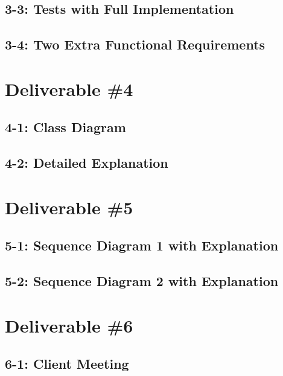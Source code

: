 \documentclass[11pt,a4paper]{article}
\begin{document}
\subsection*{3-3: Tests with Full Implementation}

\subsection*{3-4: Two Extra Functional Requirements}

\newpage


\section*{Deliverable \#4}

\subsection*{4-1: Class Diagram}

\subsection*{4-2: Detailed Explanation}

\newpage

\section*{Deliverable \#5}

\subsection*{5-1: Sequence Diagram 1 with Explanation}


\subsection*{5-2: Sequence Diagram 2 with Explanation}

\newpage

\section*{Deliverable \#6}

\subsection*{6-1: Client Meeting}
\end{document}
